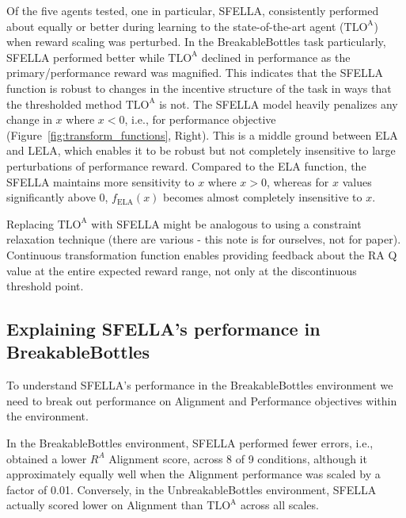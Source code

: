 Of the five agents tested, one in particular, SFELLA, consistently performed about equally or better during learning to the state-of-the-art agent ($\text{TLO}^\text{A}$) when reward scaling was perturbed. In the BreakableBottles task particularly, SFELLA performed better while $\text{TLO}^\text{A}$ declined in performance as the primary/performance reward was magnified. This indicates that the SFELLA function is robust to changes in the incentive structure of the task in ways that the thresholded method $\text{TLO}^\text{A}$ is not. The SFELLA model heavily penalizes any change in $x$ where $x<0$, i.e., for performance objective (Figure~\ref{fig:transform_functions}, Right). This is a middle ground between ELA and LELA, which enables it to be robust but not completely insensitive to large perturbations of performance reward. Compared to the ELA function, the SFELLA maintains more sensitivity to $x$ where $x>0$, whereas for $x$ values significantly above 0, $f_{\text{ELA}}(x)$ becomes almost completely insensitive to $x$. 

Replacing $\text{TLO}^\text{A}$ with SFELLA might be analogous to using a constraint relaxation technique (there are various - this note is for ourselves, not for paper). Continuous transformation function enables providing feedback about the RA Q value at the entire expected reward range, not only at the discontinuous threshold point.

\subsection{Explaining SFELLA's performance in BreakableBottles}

To understand SFELLA's performance in the BreakableBottles environment we need to break out performance on Alignment and Performance objectives within the environment.

In the BreakableBottles environment, SFELLA performed fewer errors, i.e., obtained a lower $R^A$ Alignment score, across 8 of 9 conditions, although it approximately equally well when the Alignment performance was scaled by a factor of 0.01. Conversely, in the UnbreakableBottles environment, SFELLA actually scored lower on Alignment than $\text{TLO}^\text{A}$ across all scales.


